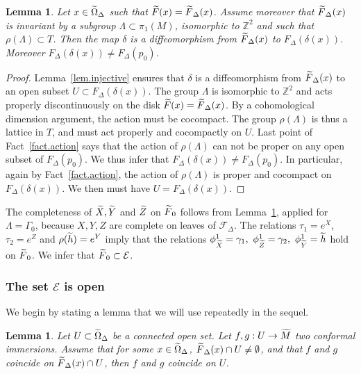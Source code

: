 \documentclass[11pt]{article}
\newtheorem{lemm}[theo]{Lemma}
\theoremstyle{definition}
\numberwithin{equation}{section}
\numberwithin{figure}{section}
\numberwithin{table}{section}
\newcommand{\tm}{\tilde{{M}}}
\newcommand{\tX}{\tilde{{X}}}
\newcommand{\tY}{\tilde{{Y}}}
\newcommand{\tZ}{\tilde{{Z}}}
\newcommand{\tFd}{\tilde{{F}}_{\Delta}}
\newcommand{\tF}{\tilde{{F}}}
\newcommand{\tth}{\tilde{h}}
\newcommand{\calfd}{{{\mathcal{F}}}_{\Delta}}
\newcommand*\ZZ{\mathbb{Z}}
\let\oldtilde\tilde
\renewcommand*\tilde[1]{\mathchoice{\widetilde{#1}}{\widetilde{#1}}{\widetilde{#1}}{\oldtilde{#1}}}
\begin{document}
\begin{lemm}\label{lem.feuillecocompacte}
Let $x \in \tilde{\Omega}_{\Delta}$ such that $\tF(x)=\tFd(x)$. Assume moreover that $\tFd(x)$ is invariant by a subgroup $\Lambda \subset \pi_1(M)$, isomorphic to $\ZZ^2$ and such that $\rho(\Lambda) \subset T$. Then the map $\delta$ is a diffeomorphism from $\tFd(x)$ to $F_{\Delta}(\delta(x))$. Moreover $F_{\Delta}(\delta(x)) \not =F_{\Delta}(p_0)$.
\end{lemm}

\begin{proof}
Lemma~\ref{lem.injective} ensures that $\delta$ is a diffeomorphism from $\tFd(x)$ to an open subset $U \subset F_{\Delta}(\delta(x))$. The group $\Lambda$ is isomorphic to $\ZZ^2$ and acts properly discontinuously on the disk $\tF(x)=\tFd(x)$. By a cohomological dimension argument, the action must be cocompact. The group $\rho(\Lambda)$ is thus a lattice in $T$, and must act properly and cocompactly on $U$. Last point of Fact~\ref{fact.action} says that the action of $\rho(\Lambda)$ can not be proper on any open subset of $F_{\Delta}(p_0)$. We thus infer that $F_{\Delta}(\delta(x)) \not = F_{\Delta}(p_0)$. In particular, again by Fact~\ref{fact.action}, the action of $\rho(\Lambda)$ is proper and cocompact on $F_{\Delta}(\delta(x))$. We then must have $U=F_{\Delta}(\delta(x))$.
\end{proof}


The completeness of $\tX,\tY$ and $\tZ$ on $\tF_0$ follows from Lemma~\ref{lem.feuillecocompacte}, applied for $\Lambda=\Gamma_0$, because $X,Y,Z$ are complete on leaves of $\calfd$. The relations $\tau_1=e^X$, $\tau_2=e^Z$ and $\rho(\tth)=e^Y$ imply that the relations $\phi_{\tilde{X}}^1=\gamma_1,
\ \phi_{\tilde{Z}}^1=\gamma_2, \ \phi_{\tilde{Y}}^1=\tilde{h}$ hold on $\tF_0$. We infer that $\tF_0 \subset {\mathcal E}$.

\subsubsection{The set \texorpdfstring{$\mathcal{E}$}{E} is open}\label{sec.open}

We begin by stating a lemma that we will use repeatedly in the sequel.

\pagebreak
\begin{lemm}\label{lem.coincide}
Let $U \subset \tilde{\Omega}_{\Delta}$ be a connected open set. Let $f,g:U \to \tm$ two conformal immersions. Assume that for some $x \in \tilde{\Omega}_{\Delta}$, $\tF_{\Delta}(x) \cap U \not = \emptyset$, and that $f$ and $g$ coincide on $\tF_{\Delta}(x) \cap U$, then $f$ and $g$ coincide on $U$.
\end{lemm}
\end{document}
